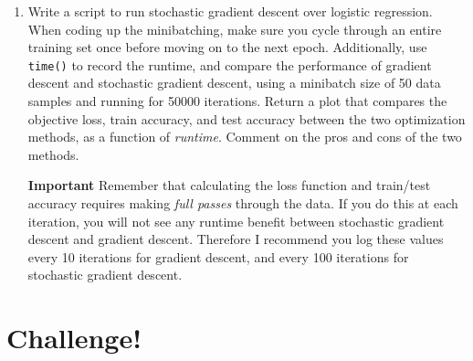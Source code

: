 \documentclass{article}
\begin{document}
\begin{enumerate}
\begin{enumerate}
\item Write a script to run stochastic gradient descent over logistic regression. When coding up the minibatching, make sure you cycle through an entire training set once before moving on to the next epoch. Additionally, use \texttt{time()} to record the runtime, and compare the performance of gradient descent and stochastic gradient descent, using a minibatch size of 50 data samples and running for 50000 iterations. Return a plot that compares the objective loss, train accuracy, and test accuracy between the two optimization methods, as a function of \emph{runtime}. Comment on the pros and cons of the two methods.


\textbf{Important} Remember that calculating the loss function and train/test accuracy requires making \emph{full passes} through the data. If you do this at each iteration, you will not see any runtime benefit between stochastic gradient descent and gradient descent. Therefore I recommend you log these values every 10 iterations for gradient descent, and every 100 iterations for stochastic gradient descent. 


\end{enumerate}

\end{enumerate}

\newpage

\section*{Challenge!}
\end{document}
